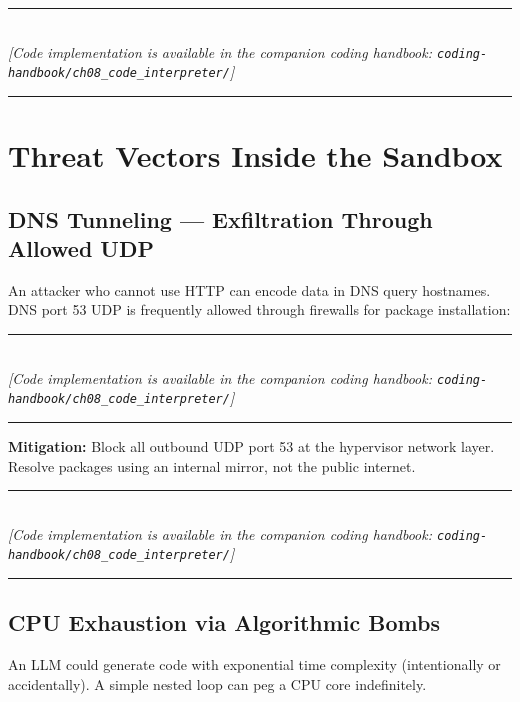 \begin{center}
\noindent\rule{0.6\textwidth}{0.4pt} \\
\vspace{0.3em}
\textit{[Code implementation is available in the companion coding handbook: \texttt{coding-handbook/ch08\_code\_interpreter/}]} \\
\noindent\rule{0.6\textwidth}{0.4pt}
\end{center}


\section{Threat Vectors Inside the Sandbox}

\subsection{DNS Tunneling — Exfiltration Through Allowed UDP}
An attacker who cannot use HTTP can encode data in DNS query hostnames. DNS port 53 UDP is frequently allowed through firewalls for package installation:


\begin{center}
\noindent\rule{0.6\textwidth}{0.4pt} \\
\vspace{0.3em}
\textit{[Code implementation is available in the companion coding handbook: \texttt{coding-handbook/ch08\_code\_interpreter/}]} \\
\noindent\rule{0.6\textwidth}{0.4pt}
\end{center}


\textbf{Mitigation:} Block all outbound UDP port 53 at the hypervisor network layer. Resolve packages using an internal mirror, not the public internet.


\begin{center}
\noindent\rule{0.6\textwidth}{0.4pt} \\
\vspace{0.3em}
\textit{[Code implementation is available in the companion coding handbook: \texttt{coding-handbook/ch08\_code\_interpreter/}]} \\
\noindent\rule{0.6\textwidth}{0.4pt}
\end{center}


\subsection{CPU Exhaustion via Algorithmic Bombs}
An LLM could generate code with exponential time complexity (intentionally or accidentally). A simple nested loop can peg a CPU core indefinitely.


